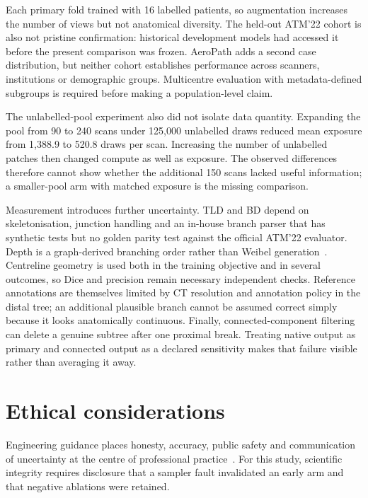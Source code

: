 Each primary fold trained with 16 labelled patients, so augmentation increases the number of
views but not anatomical diversity. The held-out ATM'22 cohort is also not pristine confirmation:
historical development models had accessed it before the present comparison was frozen. AeroPath
adds a second case distribution, but neither cohort establishes performance across scanners,
institutions or demographic groups. Multicentre evaluation with metadata-defined subgroups is
required before making a population-level claim.

The unlabelled-pool experiment also did not isolate data quantity. Expanding the pool from 90 to
240 scans under 125{,}000 unlabelled draws reduced mean exposure from 1{,}388.9 to 520.8 draws per
scan. Increasing the number of unlabelled patches then changed compute as well as exposure. The
observed differences therefore cannot show whether the additional 150 scans lacked useful
information; a smaller-pool arm with matched exposure is the missing comparison.

Measurement introduces further uncertainty. TLD and BD depend on skeletonisation, junction
handling and an in-house branch parser that has synthetic tests but no golden parity test against
the official ATM'22 evaluator. Depth is a graph-derived branching order rather than Weibel
generation~\cite{weibel1963morphometry,tschirren2005airway,palagyi2006airway}. Centreline geometry is used both in the
training objective and in several outcomes, so Dice and precision remain necessary independent
checks. Reference annotations are themselves limited by CT resolution and annotation policy in
the distal tree; an additional plausible branch cannot be assumed correct simply because it
looks anatomically continuous. Finally, connected-component filtering can delete a genuine
subtree after one proximal break. Treating native output as primary and connected output as a
declared sensitivity makes that failure visible rather than averaging it away.

\section{Ethical considerations}

Engineering guidance places honesty, accuracy, public safety and communication of uncertainty at
the centre of professional practice~\cite{engineeringcouncil2026ethics}. For this study,
scientific integrity requires disclosure that a sampler fault invalidated an early arm and that
negative ablations were retained.

